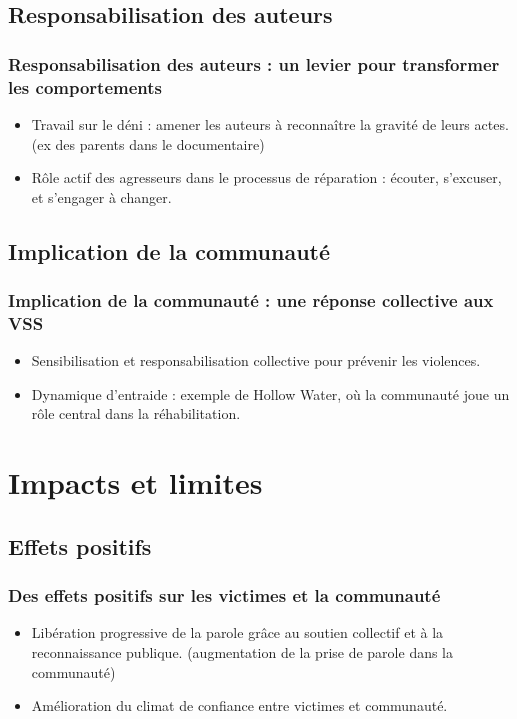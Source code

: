 \documentclass[french]{beamer}
\begin{document}
\subsection{Responsabilisation des auteurs}
\begin{frame}
	\frametitle{Responsabilisation des auteurs : un levier pour transformer les comportements}
	\begin{itemize}
		\item Travail sur le déni : amener les auteurs à reconnaître la gravité de leurs actes. (ex des parents dans le documentaire)
		\item Rôle actif des agresseurs dans le processus de réparation : écouter, s’excuser, et s’engager à changer.
	\end{itemize}
\end{frame}

\subsection{Implication de la communauté}
\begin{frame}
	\frametitle{Implication de la communauté : une réponse collective aux VSS}
	\begin{itemize}
		\item Sensibilisation et responsabilisation collective pour prévenir les violences.
		\item Dynamique d’entraide : exemple de Hollow Water, où la communauté joue un rôle central dans la réhabilitation.
	\end{itemize}
\end{frame}

\section{Impacts et limites}
\subsection{Effets positifs}
\begin{frame}
	\frametitle{Des effets positifs sur les victimes et la communauté}
	\begin{itemize}
		\item Libération progressive de la parole grâce au soutien collectif et à la reconnaissance publique. (augmentation de la prise de parole dans la communauté)
		\item Amélioration du climat de confiance entre victimes et communauté.
	\end{itemize}
\end{frame}
\end{document}
